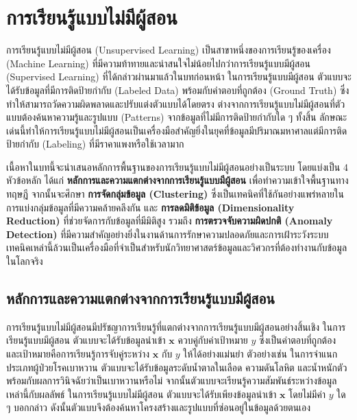 ﻿\chapter{การเรียนรู้แบบไม่มีผู้สอน}
\label{CH6_Unsupervised}

การเรียนรู้แบบไม่มีผู้สอน (Unsupervised Learning) เป็นสาขาหนึ่งของการเรียนรู้ของเครื่อง (Machine Learning) ที่มีความท้าทายและน่าสนใจไม่น้อยไปกว่าการเรียนรู้แบบมีผู้สอน (Supervised Learning) ที่ได้กล่าวผ่านมาแล้วในบทก่อนหน้า ในการเรียนรู้แบบมีผู้สอน ตัวแบบจะได้รับข้อมูลที่มีการติดป้ายกำกับ (Labeled Data) พร้อมกับคำตอบที่ถูกต้อง (Ground Truth) ซึ่งทำให้สามารถวัดความผิดพลาดและปรับแต่งตัวแบบได้โดยตรง ต่างจากการเรียนรู้แบบไม่มีผู้สอนที่ตัวแบบต้องค้นหาความรู้และรูปแบบ (Patterns) จากข้อมูลที่ไม่มีการติดป้ายกำกับใด ๆ ทั้งสิ้น ลักษณะเด่นนี้ทำให้การเรียนรู้แบบไม่มีผู้สอนเป็นเครื่องมือสำคัญยิ่งในยุคที่ข้อมูลมีปริมาณมหาศาลแต่มีการติดป้ายกำกับ (Labeling) ที่มีราคาแพงหรือใช้เวลามาก

เนื้อหาในบทนี้จะนำเสนอหลักการพื้นฐานของการเรียนรู้แบบไม่มีผู้สอนอย่างเป็นระบบ โดยแบ่งเป็น 4 หัวข้อหลัก ได้แก่ \textbf{หลักการและความแตกต่างจากการเรียนรู้แบบมีผู้สอน} เพื่อทำความเข้าใจพื้นฐานทางทฤษฎี จากนั้นจะศึกษา \textbf{การจัดกลุ่มข้อมูล (Clustering)} ซึ่งเป็นเทคนิคที่ใช้กันอย่างแพร่หลายในการแบ่งกลุ่มข้อมูลที่มีความคล้ายคลึงกัน และ \textbf{การลดมิติข้อมูล (Dimensionality Reduction)} ที่ช่วยจัดการกับข้อมูลที่มีมิติสูง รวมถึง \textbf{การตรวจจับความผิดปกติ (Anomaly Detection)} ที่มีความสำคัญอย่างยิ่งในงานด้านการรักษาความปลอดภัยและการเฝ้าระวังระบบ เทคนิคเหล่านี้ล้วนเป็นเครื่องมือที่จำเป็นสำหรับนักวิทยาศาสตร์ข้อมูลและวิศวกรที่ต้องทำงานกับข้อมูลในโลกจริง

\section{หลักการและความแตกต่างจากการเรียนรู้แบบมีผู้สอน}

การเรียนรู้แบบไม่มีผู้สอนมีปรัชญาการเรียนรู้ที่แตกต่างจากการเรียนรู้แบบมีผู้สอนอย่างสิ้นเชิง ในการเรียนรู้แบบมีผู้สอน ตัวแบบจะได้รับข้อมูลนำเข้า $\mathbf{x}$ ควบคู่กับค่าเป้าหมาย $y$ ซึ่งเป็นคำตอบที่ถูกต้อง และเป้าหมายคือการเรียนรู้การจับคู่ระหว่าง $\mathbf{x}$ กับ $y$ ให้ได้อย่างแม่นยำ ตัวอย่างเช่น ในการจำแนกประเภทผู้ป่วยโรคเบาหวาน ตัวแบบจะได้รับข้อมูลระดับน้ำตาลในเลือด ความดันโลหิต และน้ำหนักตัว พร้อมกับผลการวินิจฉัยว่าเป็นเบาหวานหรือไม่ จากนั้นตัวแบบจะเรียนรู้ความสัมพันธ์ระหว่างข้อมูลเหล่านี้กับผลลัพธ์ ในการเรียนรู้แบบไม่มีผู้สอน ตัวแบบจะได้รับเพียงข้อมูลนำเข้า $\mathbf{x}$ โดยไม่มีค่า $y$ ใด ๆ บอกกล่าว ดังนั้นตัวแบบจึงต้องค้นหาโครงสร้างและรูปแบบที่ซ่อนอยู่ในข้อมูลด้วยตนเอง

